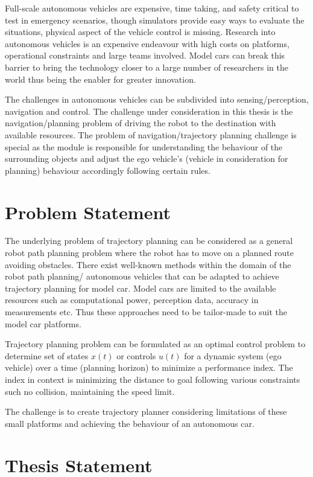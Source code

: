 Full-scale autonomous vehicles are expensive, time taking, and safety critical to test in emergency scenarios, though simulators provide easy ways to evaluate the situations, physical aspect of the vehicle control is missing. Research into autonomous vehicles is an expensive endeavour with high costs on platforms, operational constraints and large teams involved. Model cars can break this barrier to bring the technology closer to a large number of researchers in the world thus being the enabler for greater innovation.

The challenges in autonomous vehicles can be subdivided into sensing/perception, navigation and control. The challenge under consideration in this thesis is the navigation/planning problem of driving the robot to the destination with available resources. The problem of navigation/trajectory planning challenge is special as the module is responsible for understanding the behaviour of the surrounding objects and adjust the ego vehicle's (vehicle in consideration for planning) behaviour accordingly following certain rules.

\section{Problem Statement}

The underlying problem of trajectory planning can be considered as a general robot path planning problem where the robot has to move on a planned route avoiding obstacles. There exist well-known methods within the domain of the robot path planning/ autonomous vehicles that can be adapted to achieve trajectory planning for model car. Model cars are limited to the available resources such as computational power, perception data, accuracy in measurements etc. Thus these approaches need to be tailor-made to suit the model car platforms.

Trajectory planning problem can be formulated as an optimal control problem to determine set of states $x(t)$ or controls $u(t)$ for a dynamic system (ego vehicle) over a time (planning horizon) to minimize a performance index. The index in context is minimizing the distance to goal following various constraints such no collision, maintaining the speed limit.

The challenge is to create trajectory planner considering limitations of these small platforms and achieving the behaviour of an autonomous car.

\section{Thesis Statement}

